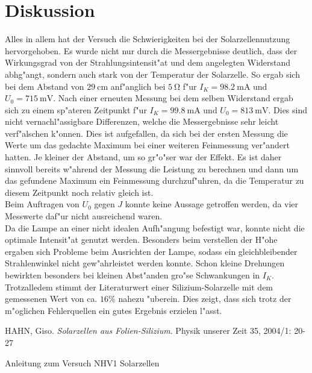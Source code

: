 \newpage
\section{Diskussion}
	\label{sec:diskussion}

	Alles in allem hat der Versuch die Schwierigkeiten bei der Solarzellennutzung hervorgehoben.
	Es wurde nicht nur durch die Messergebnisse deutlich, dass der Wirkungsgrad von der Strahlungsintensit"at und dem angelegten Widerstand abhg"angt, sondern auch stark von der Temperatur der Solarzelle.
	So ergab sich bei dem Abstand von $\SI{29}{\centi\meter}$ anf"anglich bei $\SI{5}{\ohm}$ f"ur $I_K = \SI{98.2}{\milli\ampere}$ und $U_0 = \SI{715}{\milli\volt}$.
	Nach einer erneuten Messung bei dem selben Widerstand ergab sich zu einem sp"ateren Zeitpunkt f"ur $I_K = \SI{99.8}{\milli\ampere}$ und $U_0 = \SI{813}{\milli\volt}$. Dies sind nicht vernachl"assigbare Differenzen, welche die Messergebnisse sehr leicht verf"alschen k"onnen.
	Dies ist aufgefallen, da sich bei der ersten Messung die Werte um das gedachte Maximum bei einer weiteren Feinmessung ver"andert hatten.
	Je kleiner der Abstand, um so gr"o"ser war der Effekt.
	Es ist daher sinnvoll bereits w"ahrend der Messung die Leistung zu berechnen und dann um das gefundene Maximum ein Feinmessung durchzuf"uhren, da die Temperatur zu diesem Zeitpunkt noch relativ gleich ist.\\
	Beim Auftragen von $U_0$ gegen $J$ konnte keine Aussage getroffen werden, da vier Messwerte daf"ur nicht ausreichend waren.\\
	Da die Lampe an einer nicht idealen Aufh"angung befestigt war, konnte nicht die optimale Intensit"at genutzt werden.
	Besonders beim verstellen der H"ohe ergaben sich Probleme beim Ausrichten der Lampe, sodass ein gleichbleibender Strahlenwinkel nicht gew"ahrleistet werden konnte.
	Schon kleine Drehungen bewirkten besonders bei kleinen Abst"anden gro"se Schwankungen in $I_K$.\\
	Trotzalledem stimmt der Literaturwert einer Silizium-Solarzelle  mit dem gemessenen Wert von ca. $16\%$ nahezu "uberein.
	Dies zeigt, dass sich trotz der m"oglichen Fehlerquellen ein gutes Ergebnis erzielen l"asst.

\begin{thebibliography}{9}
	 HAHN, Giso. \emph{Solarzellen aus Folien-Silizium}. Physik unserer Zeit 35, 2004/1: 20-27

	 Anleitung zum Versuch NHV1 Solarzellen
\end{thebibliography}